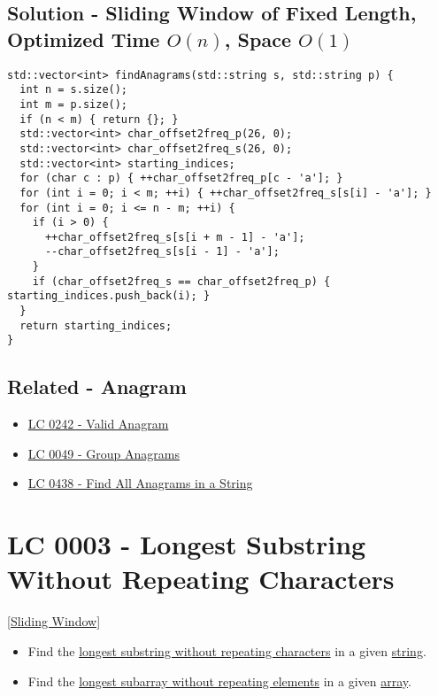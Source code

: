 {\subsection*{Solution - Sliding Window of Fixed Length, Optimized {\scriptsize\color{gray}\Coffeecup\hspace{1mm}Time $O(n)$, Space $O(1)$}}
\begin{lstlisting}
std::vector<int> findAnagrams(std::string s, std::string p) {
  int n = s.size();
  int m = p.size();
  if (n < m) { return {}; }
  std::vector<int> char_offset2freq_p(26, 0);
  std::vector<int> char_offset2freq_s(26, 0);
  std::vector<int> starting_indices;
  for (char c : p) { ++char_offset2freq_p[c - 'a']; }
  for (int i = 0; i < m; ++i) { ++char_offset2freq_s[s[i] - 'a']; }
  for (int i = 0; i <= n - m; ++i) {
    if (i > 0) {
      ++char_offset2freq_s[s[i + m - 1] - 'a'];
      --char_offset2freq_s[s[i - 1] - 'a'];
    }
    if (char_offset2freq_s == char_offset2freq_p) { starting_indices.push_back(i); }
  }
  return starting_indices;
}
\end{lstlisting}

\subsection*{Related - Anagram}
\begin{itemize}
\item \hyperref[lc0242]{LC 0242 - Valid Anagram}
\item \hyperref[lc0049]{LC 0049 - Group Anagrams}
\item \hyperref[lc0438]{LC 0438 - Find All Anagrams in a String}
\end{itemize}


\section{LC 0003 - Longest Substring Without Repeating Characters}\label{lc0003}
{\hyperref[sec:sliding_window]{[Sliding Window]}}

\begin{tcolorbox}
\begin{itemize}
\item Find the \ul{longest substring without repeating characters} in a given \ul{string}.
\item Find the \ul{longest subarray without repeating elements} in a given \ul{array}.
\end{itemize}
\end{tcolorbox}

}
